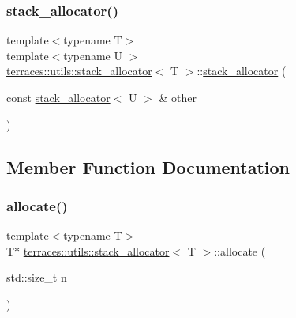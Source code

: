 \mbox{\label{classterraces_1_1utils_1_1stack__allocator_a786655b3258a2c776901389ca5c1c762}} 
\subsubsection{\texorpdfstring{stack\+\_\+allocator()}{stack\_allocator()}\hspace{0.1cm}{\footnotesize\ttfamily [2/2]}}
{\footnotesize\ttfamily template$<$typename T$>$ \\
template$<$typename U $>$ \\
\hyperlink{classterraces_1_1utils_1_1stack__allocator}{terraces\+::utils\+::stack\+\_\+allocator}$<$ T $>$\+::\hyperlink{classterraces_1_1utils_1_1stack__allocator}{stack\+\_\+allocator} (\begin{DoxyParamCaption}\item[{const \hyperlink{classterraces_1_1utils_1_1stack__allocator}{stack\+\_\+allocator}$<$ U $>$ \&}]{other }\end{DoxyParamCaption})\hspace{0.3cm}{\ttfamily [inline]}}



\subsection{Member Function Documentation}
\mbox{\label{classterraces_1_1utils_1_1stack__allocator_afcc195b71e290468330bf444ab27a237}} 
\subsubsection{\texorpdfstring{allocate()}{allocate()}}
{\footnotesize\ttfamily template$<$typename T$>$ \\
T$\ast$ \hyperlink{classterraces_1_1utils_1_1stack__allocator}{terraces\+::utils\+::stack\+\_\+allocator}$<$ T $>$\+::allocate (\begin{DoxyParamCaption}\item[{std\+::size\+\_\+t}]{n }\end{DoxyParamCaption})\hspace{0.3cm}{\ttfamily [inline]}}

